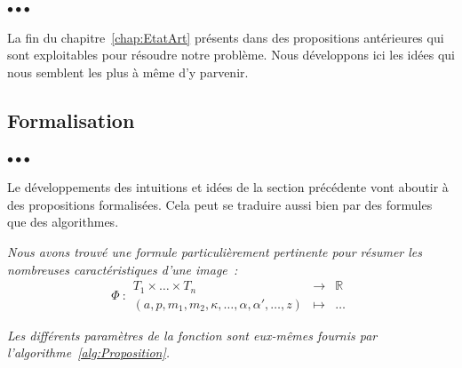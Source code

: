 \documentclass[11pt, french, screen, research-development]{report-rd-info}
\newenvironment{explanation}
{\color{blue}
 \begin{list}{}{\hspace{0.2\textwidth}\color{blue}}\item $\bullet\bullet\bullet$
}
{\end{list}}
\begin{document}
\begin{explanation}
   La fin du chapitre~\ref{chap:EtatArt} présents dans des propositions antérieures qui sont exploitables pour résoudre notre problème.
   Nous développons ici les idées qui nous semblent les plus à même d'y parvenir.
\end{explanation}

\subsection{Formalisation}

\begin{explanation}
   Le développements des intuitions et idées de la section précédente vont aboutir à des propositions formalisées.
   Cela peut se traduire aussi bien par des formules que des algorithmes.

   \emph{Nous avons trouvé une formule particulièrement pertinente pour résumer les nombreuses caractéristiques d'une image~:}
   \begin{equation}
      \label{eq:Proposition}
      \Phi~:
         \begin{array}{ccc}
            T_1 \times \ldots \times T_n & \to & \mathbb{R}\\
            (a, p, m_1, m_2, \kappa, \ldots, \alpha, \alpha', \ldots,z) & \mapsto & \ldots
         \end{array}
   \end{equation}

   \emph{Les différents paramètres de la fonction sont eux-mêmes fournis par l'algorithme~\ref{alg:Proposition}.}
\end{explanation}
\end{document}
